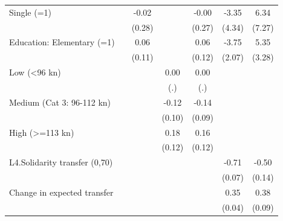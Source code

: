 {\begin{tabular}{l*{6}{c}}
Single (=1)         &                     &       -0.02         &                     &       -0.00         &       -3.35         &        6.34         \\
                    &                     &      (0.28)         &                     &      (0.27)         &      (4.34)         &      (7.27)         \\
Education: Elementary (=1)&                     &        0.06         &                     &        0.06         &       -3.75\sym{*}  &        5.35         \\
                    &                     &      (0.11)         &                     &      (0.12)         &      (2.07)         &      (3.28)         \\
Low (<96 kn)        &                     &                     &        0.00         &        0.00         &                     &                     \\
                    &                     &                     &         (.)         &         (.)         &                     &                     \\
Medium (Cat 3: 96-112 kn)&                     &                     &       -0.12         &       -0.14         &                     &                     \\
                    &                     &                     &      (0.10)         &      (0.09)         &                     &                     \\
High (>=113 kn)     &                     &                     &        0.18         &        0.16         &                     &                     \\
                    &                     &                     &      (0.12)         &      (0.12)         &                     &                     \\
L4.Solidarity transfer (0,70)&                     &                     &                     &                     &       -0.71\sym{***}&       -0.50\sym{***}\\
                    &                     &                     &                     &                     &      (0.07)         &      (0.14)         \\
Change in expected transfer&                     &                     &                     &                     &        0.35\sym{***}&        0.38\sym{***}\\
                    &                     &                     &                     &                     &      (0.04)         &      (0.09)         \\

\end{tabular}}
